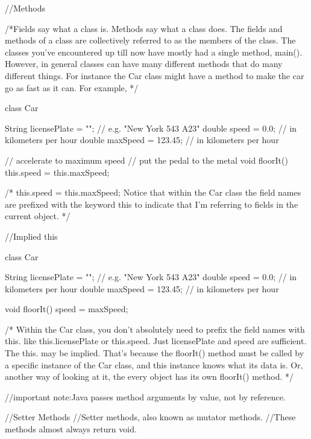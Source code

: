 //Methods

/*Fields say what a class is. Methods say what a class does. 
The fields and methods of a class are collectively referred 
to as the members of the class.
The classes you've encountered up till now have mostly had a 
single method, main(). However, in general classes can have many 
different methods that do many different things.
For instance the Car class might have a method to make the car
go as fast as it can. For example,
*/

class Car {

  String licensePlate = "";    // e.g. "New York 543 A23"
  double speed        = 0.0;   // in kilometers per hour
  double maxSpeed     = 123.45; // in kilometers per hour
  
  // accelerate to maximum speed
  // put the pedal to the metal
  void floorIt() {
    this.speed = this.maxSpeed;  
  }
  
}
/*
this.speed = this.maxSpeed;
Notice that within the Car class the field names are prefixed with 
the keyword this to indicate that I'm referring to fields in the 
current object.
*/

//Implied this

class Car {

  String licensePlate = "";     // e.g. "New York 543 A23"
  double speed        = 0.0;    // in kilometers per hour
  double maxSpeed     = 123.45; // in kilometers per hour
  
  void floorIt() {
    speed = maxSpeed;
  }

}

/* Within the Car class, you don't absolutely need to prefix the 
field names with this. like this.licensePlate or this.speed. 
Just licensePlate and speed are sufficient. The this. 
may be implied. That's because the floorIt() method must be 
called by a specific instance of the Car class, and this instance 
knows what its data is. Or, another way of looking at it, 
the every object has its own floorIt() method.
*/

//important note:Java passes method arguments by value, not by reference.


//Setter Methods
//Setter methods, also known as mutator methods.
//These methods almost always return void.

